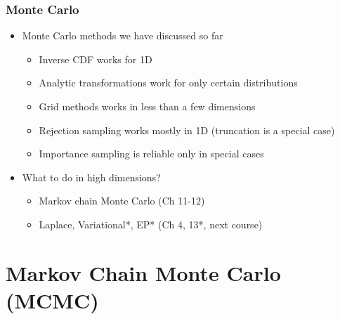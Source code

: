 \documentclass[10pt]{beamer}
\begin{document}
\begin{frame}

\frametitle{ Monte Carlo}

  \begin{itemize}
  \item Monte Carlo methods we have discussed so far
    \begin{itemize}
    \item Inverse CDF works for 1D \pause
    \item Analytic transformations work for only certain distributions \pause
    \item Grid methods works in less than a few dimensions \pause
    \item Rejection sampling works mostly in 1D (truncation is a special case) \pause
    \item Importance sampling is reliable only in special cases \pause
    \end{itemize}
    \pause
  \item What to do in high dimensions? \pause
    \begin{itemize}
    \item Markov chain Monte Carlo (Ch 11-12) \pause
    \item Laplace, Variational*, EP* (Ch 4, 13*, next course)
    \end{itemize}
  \end{itemize}
\end{frame}


\section{Markov Chain Monte Carlo (MCMC)}
\end{document}
